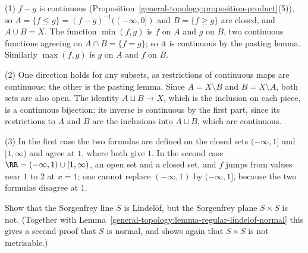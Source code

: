 \begin{solution}
(1) $f - g$ is continuous (Proposition~\ref{general-topology:proposition-product}(5)), so $A = \{f \leq g\} = (f - g)^{-1}((-\infty, 0])$ and $B = \{f \geq g\}$ are closed, and $A \cup B = X$. The function $\min(f, g)$ is
$f$ on $A$ and $g$ on $B$, two continuous functions agreeing on $A \cap B = \{f = g\}$; so it is continuous by the pasting lemma. Similarly $\max(f, g)$ is $g$ on $A$ and $f$ on $B$.

(2) One direction holds for any subsets, as restrictions of continuous maps are continuous; the other is the pasting lemma. Since $A = X \setminus B$ and $B = X \setminus A$, both sets are also open. The identity
$A \sqcup B \to X$, which is the inclusion on each piece, is a continuous bijection; its inverse is continuous by the first part, since its restrictions to $A$ and $B$ are the inclusions into $A \sqcup B$, which are continuous.

(3) In the first case the two formulas are defined on the closed sets $(-\infty, 1]$ and $[1, \infty)$ and agree at $1$, where both give $1$. In the second case $\RR = (-\infty, 1) \cup [1, \infty)$, an open set and
a closed set, and $f$ jumps from values near $1$ to $2$ at $x = 1$; one cannot replace $(-\infty, 1)$ by $(-\infty, 1]$, because the two formulas disagree at $1$.
\end{solution}

\begin{exercise}\label{general-topology:exercise-sorgenfrey-lindelof}
Show that the Sorgenfrey line $S$ is Lindel\"of, but the Sorgenfrey plane $S \times S$ is not. (Together with Lemma~\ref{general-topology:lemma-regular-lindelof-normal} this gives a second proof that $S$ is
normal, and shows again that $S \times S$ is not metrisable.)
\end{exercise}

